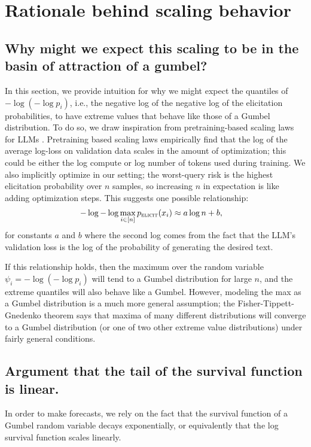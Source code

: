 \newpage

\section{Rationale behind scaling behavior}
\subsection{Why might we expect this scaling to be in the basin of attraction of a gumbel?} 
\label{sec:why-gumbel}
In this section, we provide intuition for why we might expect the quantiles of $-\log (-\log p_i)$, i.e., the negative log of the negative log of the elicitation probabilities, to have extreme values that behave like those of a Gumbel distribution. To do so, we draw inspiration from pretraining-based scaling laws for LLMs \citep{kaplan2020scaling}. Pretraining based scaling laws empirically find that the log of the average log-loss on validation data scales in the amount of optimization; this could be either the log compute or log number of tokens used during training. We also implicitly optimize in our setting; the worst-query risk is the highest elicitation probability over $n$ samples, so increasing $n$ in expectation is like adding optimization steps. This suggests one possible relationship:
\begin{align}
    -\log -\log \max_{i \in [n]} p_{\textsc{elicit}}(x_i) &\approx a \log n + b,
    \label{eqn:scaling-assumption}
\end{align}
for constants $a$ and $b$ where the second log comes from the fact that the LLM's validation loss is the log of the probability of generating the desired text. 

If this relationship holds, then the maximum over the random variable $\psi_i = -\log (-\log p_i)$ will tend to a Gumbel distribution for large $n$, and the extreme quantiles will also behave like a Gumbel. However, modeling the max as a Gumbel distribution is a much more general assumption; the Fisher-Tippett-Gnedenko theorem says that maxima of many different distributions will converge to a Gumbel distribution (or one of two other extreme value distributions) under fairly general conditions.

\subsection{Argument that the tail of the survival function is linear.}
\label{sec:survival-linear}
In order to make forecasts, we rely on the fact that the survival function of a Gumbel random variable decays exponentially, or equivalently that the log survival function scales linearly. 


